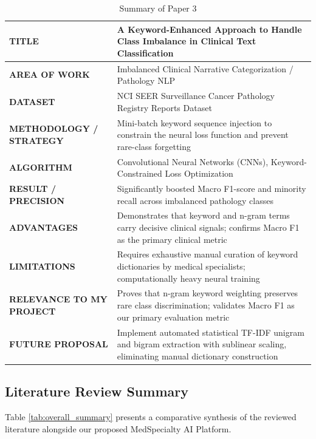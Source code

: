 \begin{table}[H]
\centering
\small
\setlength{\tabcolsep}{5pt}
\begin{tabularx}{\linewidth}{|>{\raggedright\arraybackslash}p{3.8cm}|>{\raggedright\arraybackslash}X|}
\hline
\textbf{TITLE} & A Keyword-Enhanced Approach to Handle Class Imbalance in Clinical Text Classification \cite{blanchard2022} \\
\hline
\textbf{AREA OF WORK} & Imbalanced Clinical Narrative Categorization / Pathology NLP \\
\hline
\textbf{DATASET} & NCI SEER Surveillance Cancer Pathology Registry Reports Dataset \\
\hline
\textbf{METHODOLOGY / STRATEGY} & Mini-batch keyword sequence injection to constrain the neural loss function and prevent rare-class forgetting \\
\hline
\textbf{ALGORITHM} & Convolutional Neural Networks (CNNs), Keyword-Constrained Loss Optimization \\
\hline
\textbf{RESULT / PRECISION} & Significantly boosted Macro F1-score and minority recall across imbalanced pathology classes \\
\hline
\textbf{ADVANTAGES} & Demonstrates that keyword and n-gram terms carry decisive clinical signals; confirms Macro F1 as the primary clinical metric \\
\hline
\textbf{LIMITATIONS} & Requires exhaustive manual curation of keyword dictionaries by medical specialists; computationally heavy neural training \\
\hline
\textbf{RELEVANCE TO MY PROJECT} & Proves that n-gram keyword weighting preserves rare class discrimination; validates Macro F1 as our primary evaluation metric \\
\hline
\textbf{FUTURE PROPOSAL} & Implement automated statistical TF-IDF unigram and bigram extraction with sublinear scaling, eliminating manual dictionary construction \\
\hline
\end{tabularx}
\caption{Summary of Paper 3}
\label{tab:summary_paper3}
\end{table}

\subsection{Literature Review Summary}
Table \ref{tab:overall_summary} presents a comparative synthesis of the reviewed literature alongside our proposed MedSpecialty AI Platform.


